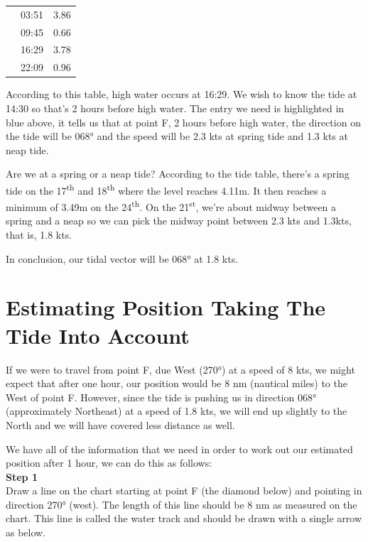 \documentclass[a4paper,10pt,oneside]{book}
\begin{document}
\begin{tabular}{|c|c|c|}
\hline
{} & 03:51 & 3.86 \\
 & 09:45 & 0.66 \\
 & 16:29 & 3.78 \\
 & 22:09 & 0.96 \\
\hline
\end{tabular}

According to this table, high water occurs at 16:29. We wish to know the tide at 14:30 so that’s 2 hours before high water. The entry we need is highlighted in blue above, it tells us that at point F, 2 hours before high water, the direction on the tide will be 068° and the speed will be 2.3 kts at spring tide and 1.3 kts at neap tide.

Are we at a spring or a neap tide? According to the tide table, there's a spring tide on the 17\textsuperscript{th} and 18\textsuperscript{th} where the level reaches 4.11m. It then reaches a minimum of 3.49m on the 24\textsuperscript{th}. On the 21\textsuperscript{st}, we're about midway between a spring and a neap so we can pick the midway point between 2.3 kts and 1.3kts, that is, 1.8 kts.

In conclusion, our tidal vector will be 068° at 1.8 kts.


\newpage
\section{Estimating Position Taking The Tide Into Account}

If we were to travel from point F, due West (270°) at a speed of 8 kts, we might expect that after one hour, our position would be 8 nm (nautical miles) to the West of point F. However, since the tide is pushing us in direction 068° (approximately Northeast) at a speed of 1.8 kts, we will end up slightly to the North and we will have covered less distance as well.

We have all of the information that we need in order to work out our estimated position after 1 hour, we can do this as follows:\\


\textbf{Step 1}\\
Draw a line on the chart starting at point F (the diamond below) and pointing in direction 270° (west). The length of this line should be 8 nm as measured on the chart. This line is called the water track and should be drawn with a single arrow as below.
\end{document}
